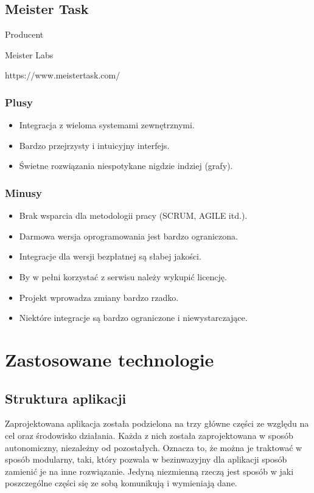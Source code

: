\documentclass[eng,printmode]{mgr}
\begin{document}
\subsection{Meister Task}
\begin{labeling}{Producent}
\item [Producent:] Meister Labs
\item [Link:] https://www.meistertask.com/
\end{labeling}
\subsubsection{Plusy}
\begin{itemize}
  \item[--] Integracja z wieloma systemami zewnętrznymi.
  \item[--] Bardzo przejrzysty i intuicyjny interfejs.
  \item[--] Świetne rozwiązania niespotykane nigdzie indziej (grafy).
\end{itemize}
\subsubsection{Minusy}
\begin{itemize}
  \item[--] Brak wsparcia dla metodologii pracy (SCRUM, AGILE itd.).
  \item[--] Darmowa wersja oprogramowania jest bardzo ograniczona.
  \item[--] Integracje dla wersji bezpłatnej są słabej jakości.
  \item[--] By w pełni korzystać z serwisu należy wykupić licencję.
  \item[--] Projekt wprowadza zmiany bardzo rzadko.
  \item[--] Niektóre integracje są bardzo ograniczone i niewystarczające.
\end{itemize}

\section{Zastosowane technologie}
\subsection{Struktura aplikacji}
Zaprojektowana aplikacja została podzielona na trzy główne części ze względu na cel oraz środowisko działania. Każda z nich została zaprojektowana w sposób autonomiczny, niezależny od pozostałych. Oznacza to, że można je traktować w sposób modularny, taki, który pozwala w bezinwazyjny dla aplikacji sposób zamienić je na inne rozwiązanie. Jedyną niezmienną rzeczą jest sposób w jaki poszczególne części się ze sobą komunikują i wymieniają dane. 
\end{document}

